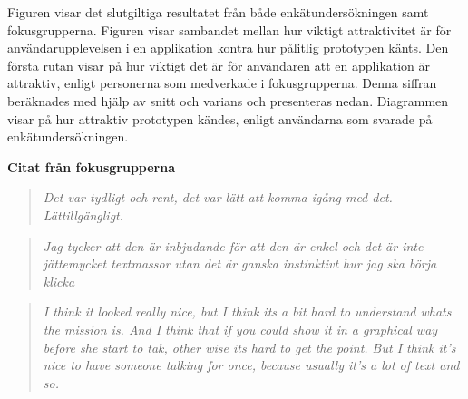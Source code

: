 Figuren visar det slutgiltiga resultatet från både enkätundersökningen samt fokusgrupperna. Figuren visar sambandet mellan hur viktigt attraktivitet är för användarupplevelsen i en applikation kontra hur pålitlig prototypen känts. Den första rutan visar på hur viktigt det är för användaren att en applikation är attraktiv, enligt personerna som medverkade i fokusgrupperna. Denna siffran beräknades med hjälp av snitt och varians och presenteras nedan. Diagrammen visar på hur attraktiv prototypen kändes, enligt användarna som svarade på enkätundersökningen. 
\newline

\textbf{Citat från fokusgrupperna}
\begin{quotation}
\em  Det var tydligt och rent, det var lätt att komma igång med det. Lättillgängligt. 
\end{quotation}

\begin{quotation}
\em  Jag tycker att den är inbjudande för att den är enkel och det är inte jättemycket textmassor utan det är ganska instinktivt hur jag ska börja klicka
\end{quotation}

\begin{quotation}
\em  I think it looked really nice, but I think its a bit hard to understand whats the mission is. And I think that if you could show it in a graphical way before she start to tak, other wise its hard to get the point.  But I think it’s nice to have someone talking for once, because usually it’s a lot of text and so.
\end{quotation}





